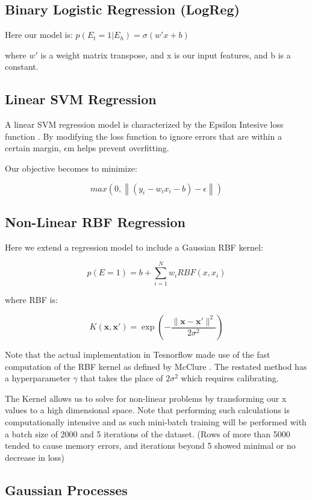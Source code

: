 \subsection{Binary Logistic Regression (LogReg)}

Here our model is:
$p(E_t = 1 | E_h) =  \sigma(w'x + b)$

where $w'$ is a weight matrix transpose, and x is our input features, and b is a constant. 

\subsection{Linear SVM Regression}

A linear SVM regression model is characterized by the Epsilon Intesive loss function \parencite{Vapnik}. By modifying the loss function to ignore errors that are within a certain margin, $\epsilon$m helps prevent overfitting.

Our objective becomes to minimize:

$$max(0,\left\| (y_i - w_i x_i - b) - \epsilon \right\|)$$


\subsection{Non-Linear RBF Regression}

Here we extend a regression model to include a Gaussian RBF kernel:

$$p(E=1)=b+\sum^N_{i=1}w_iRBF(x,x_i)$$

where RBF is:

$$K(\mathbf {x} ,\mathbf {x'} )=\exp \left(-{\frac {\|\mathbf {x} -\mathbf {x'} \|^{2}}{2\sigma ^{2}}}\right)$$

Note that the actual implementation in Tesnorflow made use of the fast computation of the RBF kernel as defined by McClure \parencite{TFCookbook}. The restated method has a hyperparameter $\gamma$ that takes the place of $2\sigma^2$ which requires calibrating.

The Kernel allows us to solve for non-linear problems by transforming our x values to a high dimensional space. Note that performing such calculations is computationally intensive and as such mini-batch training will be performed with a batch size of 2000 and 5 iterations of the dataset. (Rows of more than 5000 tended to cause memory errors, and iterations beyond 5 showed minimal or no decrease in loss)

\subsection{Gaussian Processes}





